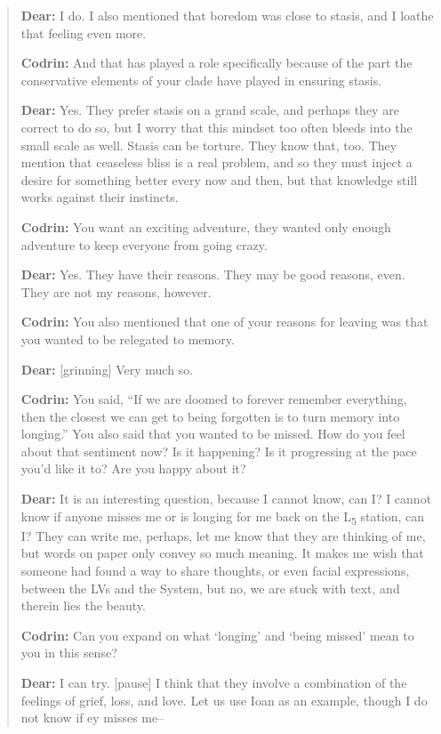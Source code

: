 \begin{quote}
\textbf{Dear:} I do. I also mentioned that boredom was close to stasis, and I loathe that feeling even more.

\textbf{Codrin:} And that has played a role specifically because of the part the conservative elements of your clade have played in ensuring stasis.

\textbf{Dear:} Yes. They prefer stasis on a grand scale, and perhaps they are correct to do so, but I worry that this mindset too often bleeds into the small scale as well. Stasis can be torture. They know that, too. They mention that ceaseless bliss is a real problem, and so they must inject a desire for something better every now and then, but that knowledge still works against their instincts.

\textbf{Codrin:} You want an exciting adventure, they wanted only enough adventure to keep everyone from going crazy.

\textbf{Dear:} Yes. They have their reasons. They may be good reasons, even. They are not my reasons, however.

\textbf{Codrin:} You also mentioned that one of your reasons for leaving was that you wanted to be relegated to memory.

\textbf{Dear:} {[}grinning{]} Very much so.

\textbf{Codrin:} You said, ``If we are doomed to forever remember everything, then the closest we can get to being forgotten is to turn memory into longing.'' You also said that you wanted to be missed. How do you feel about that sentiment now? Is it happening? Is it progressing at the pace you'd like it to? Are you happy about it?

\textbf{Dear:} It is an interesting question, because I cannot know, can I? I cannot know if anyone misses me or is longing for me back on the L\textsubscript{5} station, can I? They can write me, perhaps, let me know that they are thinking of me, but words on paper only convey so much meaning. It makes me wish that someone had found a way to share thoughts, or even facial expressions, between the LVs and the System, but no, we are stuck with text, and therein lies the beauty.

\textbf{Codrin:} Can you expand on what `longing' and `being missed' mean to you in this sense?

\textbf{Dear:} I can try. {[}pause{]} I think that they involve a combination of the feelings of grief, loss, and love. Let us use Ioan as an example, though I do not know if ey misses me--


\end{quote}
